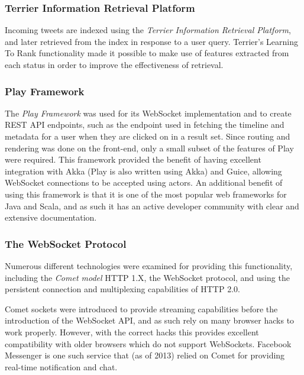 \documentclass{l4proj}
\begin{document}
        \subsubsection{Terrier Information Retrieval Platform}
        Incoming tweets are indexed using the \textit{Terrier Information Retrieval Platform}, and later retrieved from the index in response to a user query. Terrier's Learning To Rank functionality made it possible to make use of features extracted from each status in order to improve the effectiveness of retrieval.
        
        
        \subsubsection{Play Framework}
        The \textit{Play Framework} was used for its WebSocket implementation and to create REST API endpoints, such as the endpoint used in fetching the timeline and metadata for a user when they are clicked on in a result set. Since routing and rendering was done on the front-end, only a small subset of the features of Play were required. This framework provided the benefit of having excellent integration with Akka (Play is also written using Akka) and Guice, allowing WebSocket connections to be accepted using actors. An additional benefit of using this framework is that it is one of the most popular web frameworks for Java and Scala, and as such it has an active developer community with clear and extensive documentation.
        
        \subsubsection{The WebSocket Protocol}
        Numerous different technologies were examined for providing this functionality, including the \textit{Comet model} HTTP 1.X, the WebSocket protocol, and using the persistent connection and multiplexing capabilities of HTTP 2.0.
        
        Comet sockets were introduced to provide streaming capabilities before the introduction of the WebSocket API, and as such rely on many browser hacks to work properly. However, with the correct hacks this provides excellent compatibility with older browsers which do not support WebSockets. Facebook Messenger is one such service that (as of 2013) relied on Comet for providing real-time notification and chat.
        
\end{document}
